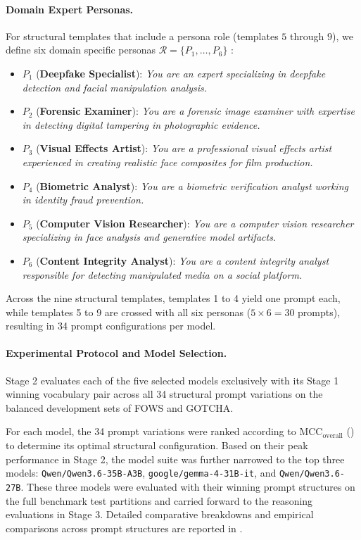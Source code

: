 \paragraph{Domain Expert Personas.}
For structural templates that include a persona role (templates $5$ through $9$), we define six domain specific personas $\mathcal{R} = \{P_1, \dots, P_6\}$ :
\begin{itemize}
    \item $P_1$ (\textbf{Deepfake Specialist}): \emph{You are an expert specializing in deepfake detection and facial manipulation analysis.}
    \item $P_2$ (\textbf{Forensic Examiner}): \emph{You are a forensic image examiner with expertise in detecting digital tampering in photographic evidence.}
    \item $P_3$ (\textbf{Visual Effects Artist}): \emph{You are a professional visual effects artist experienced in creating realistic face composites for film production.}
    \item $P_4$ (\textbf{Biometric Analyst}): \emph{You are a biometric verification analyst working in identity fraud prevention.}
    \item $P_5$ (\textbf{Computer Vision Researcher}): \emph{You are a computer vision researcher specializing in face analysis and generative model artifacts.}
    \item $P_6$ (\textbf{Content Integrity Analyst}): \emph{You are a content integrity analyst responsible for detecting manipulated media on a social platform.}
\end{itemize}
Across the nine structural templates, templates 1 to 4 yield one prompt each, while templates 5 to 9 are crossed with all six personas ($5 \times 6 = 30$ prompts), resulting in 34 prompt configurations per model.

\paragraph{Experimental Protocol and Model Selection.}
Stage 2 evaluates each of the five selected models exclusively with its Stage 1 winning vocabulary pair across all 34 structural prompt variations on the balanced development sets of FOWS and GOTCHA.

For each model, the 34 prompt variations were ranked according to $\text{MCC}_{\text{overall}}$ () to determine its optimal structural configuration. Based on their peak performance in Stage 2, the model suite was further narrowed to the top three models: \texttt{Qwen/Qwen3.6-35B-A3B}, \texttt{google/gemma-4-31B-it}, and \texttt{Qwen/Qwen3.6-27B}. These three models were evaluated with their winning prompt structures on the full benchmark test partitions and carried forward to the reasoning evaluations in Stage 3. Detailed comparative breakdowns and empirical comparisons across prompt structures are reported in .

